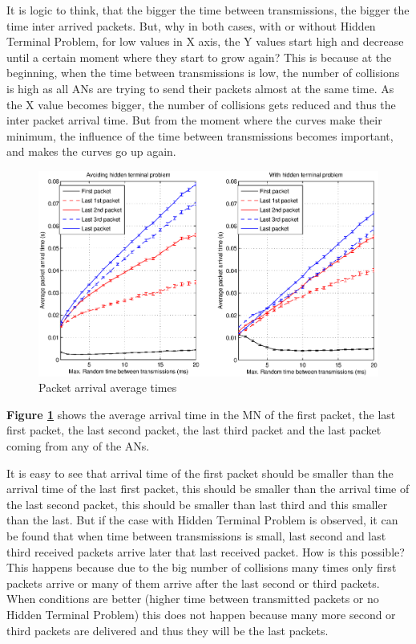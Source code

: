 It is logic to think, that the bigger the time between transmissions, the bigger the time inter arrived packets. But, why in both cases, with or 
without Hidden Terminal Problem, for low values in X axis, the Y values start high and decrease until a certain moment where they start to grow again? 
This is because at the beginning, when the time between transmissions is low, the number of collisions is high as all \acp{AN} are trying to send their
packets almost at the same time. As the X value becomes bigger, the number of collisions gets reduced and thus the inter packet arrival time. But from 
the moment where the curves make their minimum, the influence of the time between transmissions becomes important, and makes the curves go up again.

\begin{figure}[ht]
 \begin{center}
  \includegraphics[width=1\textwidth]{averageDifferentTimes.eps}
 \end{center}
 \caption{Packet arrival average times}
 \label{fig:averageDifferentTimes}
\end{figure}

\textbf{Figure \ref{fig:averageDifferentTimes}} shows the average arrival time in the \ac{MN} of the first packet, the last first packet, the last
second packet, the last third packet and the last packet coming from any of the \acp{AN}.

It is easy to see that arrival time of the first packet should be smaller than the arrival time of the last first packet, this should be smaller than
 the arrival time of the last second packet, this should be smaller than last third and this smaller than the last. But if the case with Hidden 
Terminal Problem is observed, it can be found that when time between transmissions is small, last second and last third received packets arrive later 
that last received packet. How is this possible? This happens because due to the big number of collisions many times only first packets arrive or many of 
them arrive after the last second or third packets. When conditions are better (higher time between transmitted packets or no Hidden Terminal Problem) 
this does not happen because many more second or third packets are delivered and thus they will be the last packets.

